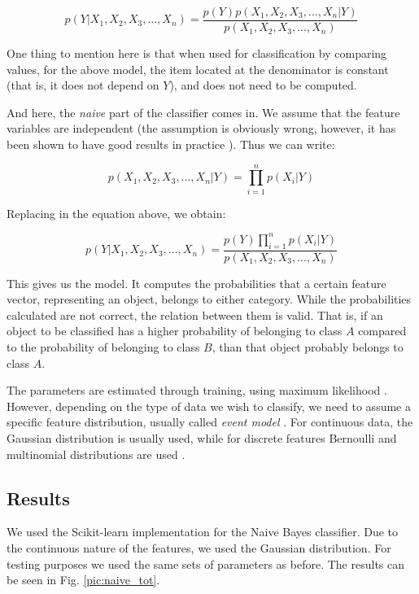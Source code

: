 \begin{equation*}
p(Y\vert X_1,X_2,X_3,..., X_n) = \frac{p(Y)p(X_1,X_2,X_3,..., X_n\vert Y)}{p(X_1,X_2,X_3,..., X_n)}
\end{equation*}

One thing to mention here is that when used for classification by comparing values, for the above model, the item located at the denominator is constant (that is, it does not depend on $Y$), and does not need to be computed. 

And here, the \textit{naive} part of the classifier comes in. We assume that the feature variables are independent (the assumption is obviously wrong, however, it has been shown to have good results in practice \cite{rish2001empirical}). Thus we can write:

\begin{equation*}
p(X_1,X_2,X_3,..., X_n\vert Y) = \prod_{i=1}^np(X_i \vert Y)
\end{equation*}

Replacing in the equation above, we obtain:

\begin{equation*}
p(Y\vert X_1,X_2,X_3,..., X_n) = \frac{p(Y)\prod \limits_{i=1}^np(X_i \vert Y)}{p(X_1,X_2,X_3,..., X_n)}
\end{equation*}

This gives us the model. It computes the probabilities that a certain feature vector, representing an object, belongs to either category. While the probabilities calculated are not correct, the relation between them is valid. That is, if an object to be classified has a higher probability of belonging to class $A$ compared to the probability of belonging to class $B$, than that object probably belongs to class $A$. 

The parameters are estimated through training, using maximum likelihood \cite{zhang2004optimality}. However, depending on the type of data we wish to classify, we need to assume a specific feature distribution, usually called \textit{event model} \cite{mccallum1998comparison}. For continuous data, the Gaussian distribution is usually used, while for discrete features Bernoulli and multinomial distributions are used \cite{mccallum1998comparison}.

\subsection{Results}

We used the Scikit-learn \cite{scikit-learn} implementation for the Naive Bayes classifier. Due to the continuous nature of the features, we used the Gaussian distribution. For testing purposes we used the same sets of parameters as before. The results can be seen in Fig. \ref{pic:naive_tot}.


